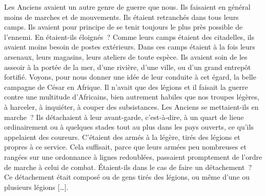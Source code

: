 \documentclass[french,twoside]{book} %
\begin{document}
Les Anciens avaient un autre genre de guerre que nous. Ils faisaient en général moins de marches et de mouvements. Ils étaient retranchés dans tous leurs camps. Ils avaient pour principe de se tenir toujours le plus près possible de l’ennemi. En étaient-ils éloignés ? Comme leurs camps étaient des citadelles, ils avaient moins besoin de postes extérieurs. Dans ces camps étaient à la fois leurs arsenaux, leurs magasins, leurs ateliers de toute espèce. Ils avaient soin de les asseoir à la portée de la mer, d’une rivière, d’une ville, ou d’un grand entrepôt fortifié. Voyons, pour nous donner une idée de leur conduite à cet égard, la belle campagne de César en Afrique. Il n’avait que des légions et il faisait la guerre contre une multitude d’Africains, bien autrement habiles que nos troupes légères, à harceler, à inquiéter, à couper des subsistances. Les Anciens se mettaient-ils en marche ? Ils détachaient à leur avant-garde, c’est-à-dire, à un quart de lieue ordinairement ou à quelques stades tout au plus dans les pays ouverts, ce qu’ils appelaient des coureurs. C’étaient des armés à la légère, tirés des légions et propres à ce service. Cela suffisait, parce que leurs armées peu nombreuses et rangées sur une ordonnance à lignes redoublées, passaient promptement de l’ordre de marche à celui de combat. Étaient-ils dans le cas de faire un détachement ? Ce détachement était composé ou de gens tirés des légions, ou même d’une ou plusieurs légions […].\par
\end{document}
